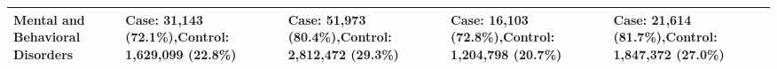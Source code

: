 \begin{table}[!ht]
\begin{tabular}{
  |L{0.85in}|L{1.4in}|L{1.4in}|L{1.4in}|L{1.4in}|
}
Mental and Behavioral Disorders &
Case: 31,143 (72.1\%),\newline Control: 1,629,099 (22.8\%) &
Case: 51,973 (80.4\%),\newline Control: 2,812,472 (29.3\%) &
Case: 16,103 (72.8\%),\newline Control: 1,204,798 (20.7\%) &
Case: 21,614 (81.7\%),\newline Control: 1,847,372 (27.0\%) \\
\hline

\end{tabular}
\end{table}